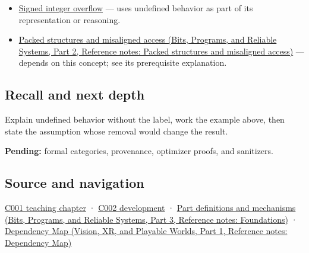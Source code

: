 \hypertarget{appendix-f558f5b4d8f2-used-by}{}

\begin{itemize}
\item
  \hyperref[appendix-1a599c924a4e]{Signed integer overflow} --- uses undefined behavior as part of its representation or reasoning.
\item
  \href{../01-Bits-Programs-and-Reliable-Systems-P02/main.pdf\#nameddest=appendix-0682dbfc5f0e}{Packed structures and misaligned access (Bits, Programs, and Reliable Systems, Part 2, Reference notes: Packed structures and misaligned access)} --- depends on this concept; see its prerequisite explanation.
\end{itemize}

\subsection{Recall and next depth}\label{appendix-f558f5b4d8f2-recall-and-next-depth}

\hypertarget{appendix-f558f5b4d8f2-recall-and-next-depth}{}

Explain undefined behavior without the label, work the example above, then state the assumption whose removal would change the result.

\textbf{Pending:} formal categories, provenance, optimizer proofs, and sanitizers.

\subsection{Source and navigation}\label{appendix-f558f5b4d8f2-source-and-navigation}

\hypertarget{appendix-f558f5b4d8f2-source-and-navigation}{}

\hyperref[01-foundations-i-ch001-from-a-signal-to-an-interpretation]{C001 teaching chapter} · \hyperref[01-foundations-i-ch001-arithmetic-becomes-a-policy]{C002 development} · \href{../01-Bits-Programs-and-Reliable-Systems-P03/main.pdf\#nameddest=appendix-fd090d982a15}{Part definitions and mechanisms (Bits, Programs, and Reliable Systems, Part 3, Reference notes: Foundations)} · \href{../07-Vision-XR-and-Playable-Worlds-P01/main.pdf\#nameddest=appendix-4ad47bdd269a}{Dependency Map (Vision, XR, and Playable Worlds, Part 1, Reference notes: Dependency Map)}
